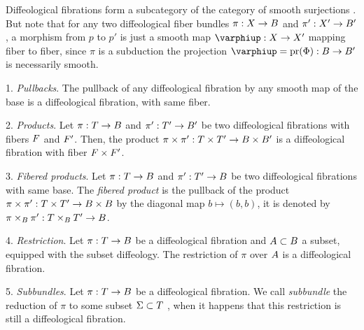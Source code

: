 \begin{article}
  \label{Diffeological-fiber-bundles-category}
  Diffeological fibrations form a subcategory of the category of smooth surjections .
  But note that for any two diffeological fiber bundles $\pi: X \to B$ and  $\pi': X' \to B'$,
  a morphism from $p$ to $p'$ is just a smooth map $\phi: \X \to \X'$ mapping fiber to fiber,
  since $\pi$ is a subduction the projection $\phi = \pr(\Phi) : \B \to \B'$ is necessarily smooth.
  
  1. {\em Pullbacks}.
  The pullback of any diffeological fibration by any smooth map of the base is a diffeological fibration,
  with same fiber.
    
  2. {\em Products}.
  Let $\pi : T \to B$ and $\pi' : T' \to B'$ be two diffeological fibrations with fibers $F$ and  $F'$.
  Then,
  the product $\pi \times \pi' : T \times T' \to B \times B'$ is a diffeological fibration with fiber $F \times F'$.
  
  3. {\em Fibered products}.
  Let $\pi : T \to B$ and $\pi' : T' \to B$ be two diffeological fibrations with same base.
  The {\em fibered product} is the pullback of the product $\pi \times \pi' : T \times T' \to B \times B$ by the diagonal map $b \mapsto (b,b)$,
  it is denoted by $\pi \times_B \pi' : T \times_B T' \to B$.

  4. {\em Restriction}.
  Let $\pi : T \to B$ be a diffeological fibration and $A \subset B$ a subset,
  equipped with the subset diffeology.
  The restriction of $\pi$ over $A$  is a diffeological fibration.
  
  5. {\em Subbundles}.
  Let $\pi : T \to B$ be a diffeological fibration.
  We call {\em subbundle} the reduction of $\pi$ to some subset $\Sigma \subset T$ ,
  when it happens that this restriction is still a diffeological fibration.
\end{article} %

